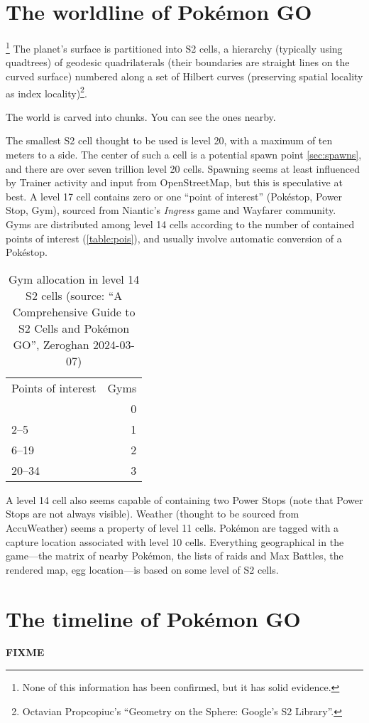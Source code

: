 \section{The worldline of Pokémon GO\label{sec:world}}\footnote{None of this information has been confirmed, but it has solid evidence.}
The planet's surface is partitioned into S2 cells, a hierarchy (typically using
 quadtrees) of geodesic quadrilaterals (their boundaries are straight lines on the curved
 surface) numbered along a set of Hilbert curves (preserving spatial locality as index locality)\footnote{Octavian Propcopiuc's ``Geometry on the Sphere: Google's S2 Library''.}.
\begin{tipbox}[title=If that meant nothing to you…]
The world is carved into chunks. You can see the ones nearby.
\end{tipbox}
The smallest S2 cell thought to be used is level 20, with a maximum of ten meters to a side.
The center of such a cell is a potential spawn point \autoref{sec:spawns}, and there are over seven trillion level 20 cells.
Spawning seems at least influenced by Trainer activity and input from OpenStreetMap, but this is speculative at best.
A level 17 cell contains zero or one ``point of interest'' (Pokéstop, Power Stop, Gym),
 sourced from Niantic's \textit{Ingress} game and Wayfarer community.
Gyms are distributed among level 14 cells according to the number of contained points of interest (\autoref{table:pois}),
 and usually involve automatic conversion of a Pokéstop.
\begin{table}
\centering
\begin{tabular}{lr}
Points of interest & Gyms\\
\Midrule
1 & 0 \\
2--5 & 1\\
6--19 & 2\\
20--34 & 3\\
\end{tabular}
\caption[Gym allocation in level 14 S2 cells]{Gym allocation in level 14 S2 cells (source: ``A Comprehensive Guide to S2 Cells and Pokémon GO'', Zeroghan 2024-03-07)\label{table:pois}}
\end{table}
A level 14 cell also seems capable of containing two Power Stops (note that Power Stops are not always visible).
 Weather (thought to be sourced from AccuWeather) seems a property of level 11 cells.
Pokémon are tagged with a capture location associated with level 10 cells.
Everything geographical in the game---the matrix of nearby Pokémon, the lists
 of raids and Max Battles, the rendered map, egg location---is based on some level of S2 cells.

\section{The timeline of Pokémon GO\label{sec:timeline}}
\textbf{FIXME}
